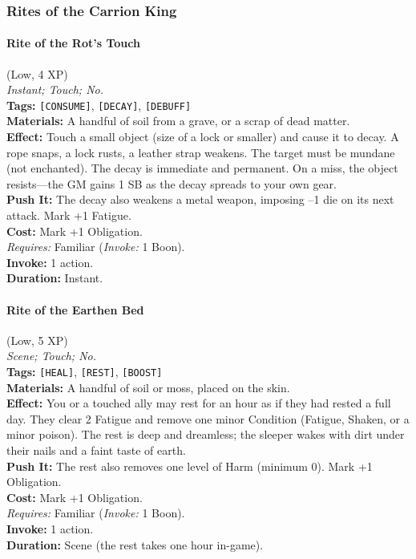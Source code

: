 \subsubsection*{Rites of the Carrion King}

\paragraph{Rite of the Rot's Touch} (Low, 4 XP) \hfill \\
\emph{Instant; Touch; No.} \\
\textbf{Tags:} \texttt{[CONSUME]}, \texttt{[DECAY]}, \texttt{[DEBUFF]} \\
\textbf{Materials:} A handful of soil from a grave, or a scrap of dead matter. \\
\textbf{Effect:} Touch a small object (size of a lock or smaller) and cause it to decay. A rope snaps, a lock rusts, a leather strap weakens. The target must be mundane (not enchanted). The decay is immediate and permanent. On a miss, the object resists---the GM gains 1 SB as the decay spreads to your own gear. \\
\textbf{Push It:} The decay also weakens a metal weapon, imposing --1 die on its next attack. Mark +1 Fatigue. \\
\textbf{Cost:} Mark +1 Obligation. \\
\textit{Requires:} Familiar (\textit{Invoke:} 1 Boon). \\
\textbf{Invoke:} 1 action. \\
\textbf{Duration:} Instant.

\paragraph{Rite of the Earthen Bed} (Low, 5 XP) \hfill \\
\emph{Scene; Touch; No.} \\
\textbf{Tags:} \texttt{[HEAL]}, \texttt{[REST]}, \texttt{[BOOST]} \\
\textbf{Materials:} A handful of soil or moss, placed on the skin. \\
\textbf{Effect:} You or a touched ally may rest for an hour as if they had rested a full day. They clear 2 Fatigue and remove one minor Condition (Fatigue, Shaken, or a minor poison). The rest is deep and dreamless; the sleeper wakes with dirt under their nails and a faint taste of earth. \\
\textbf{Push It:} The rest also removes one level of Harm (minimum 0). Mark +1 Obligation. \\
\textbf{Cost:} Mark +1 Obligation. \\
\textit{Requires:} Familiar (\textit{Invoke:} 1 Boon). \\
\textbf{Invoke:} 1 action. \\
\textbf{Duration:} Scene (the rest takes one hour in-game).

